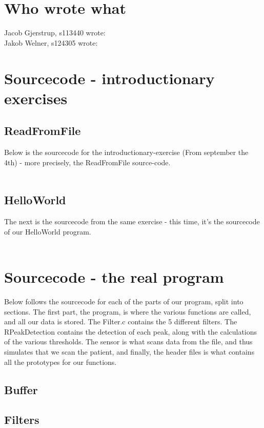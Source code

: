\documentclass[12pt,a4paper]{article}
\begin{document}
\section{Who wrote what}
Jacob Gjerstrup, s113440 wrote: \\
Jakob Welner, s124305 wrote: \\
	
\section{Sourcecode - introductionary exercises}
\subsection{ReadFromFile}
	Below is the sourcecode for the introductionary-exercise (From september the 4th) - more precisely, the ReadFromFile source-code.\\
	\\
	

\subsection{HelloWorld}
	The next is the sourcecode from the same exercise - this time, it's the sourcecode of our HelloWorld program.\\
	\\
	
	
\section{Sourcecode - the real program}
	Below follows the sourcecode for each of the parts of our program, split into sections. The first part, the program, is where the various functions are called, and all our data is stored. The Filter.c contains the 5 different filters. The RPeakDetection contains the detection of each peak, along with the calculations of the various thresholds. The sensor is what scans data from the file, and thus simulates that we scan the patient, and finally, the header files is what contains all the prototypes for our functions.
\subsection{Buffer}
		
\subsection{Filters}
	
\end{document}
